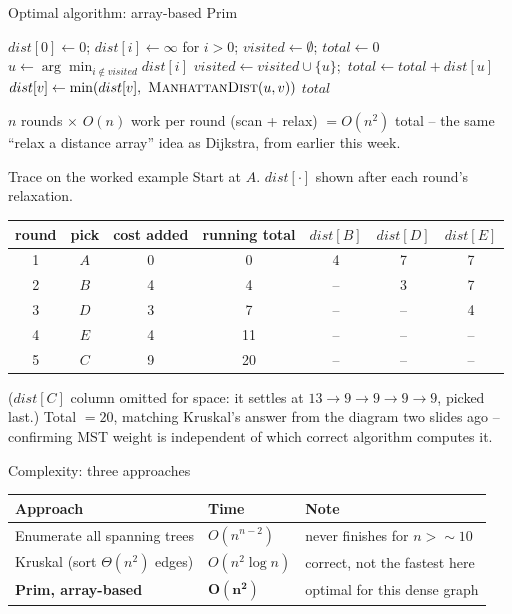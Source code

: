 \documentclass[11pt,aspectratio=169]{beamer}
\begin{document}
\begin{frame}{Optimal algorithm: array-based Prim}
  \footnotesize
  \begin{algorithmic}[1]
      \State $dist[0] \gets 0$; $dist[i] \gets \infty$ for $i>0$; $visited \gets \emptyset$; $total \gets 0$
        \State $u \gets \arg\min_{i \notin visited} dist[i]$ 
        \State $visited \gets visited \cup \{u\}$;\ $total \gets total + dist[u]$
          \State $dist[v] \gets \min(dist[v],\ \textsc{ManhattanDist}(u,v))$
        \EndFor
      \EndFor
      \State \Return $total$
    \EndFunction
  \end{algorithmic}
  $n$ rounds $\times$ $O(n)$ work per round (scan + relax) $= O(n^2)$ total --
  the same ``relax a distance array'' idea as Dijkstra, from earlier this week.
\end{frame}

\begin{frame}{Trace on the worked example}
  \scriptsize
  Start at $A$. $dist[\cdot]$ shown after each round's relaxation.
  \begin{center}
  \begin{tabular}{@{}c c c c c c c@{}}
    \toprule
    round & pick & cost added & running total & $dist[B]$ & $dist[D]$ & $dist[E]$ \\
    \midrule
    1 & $A$ & 0 & 0 & 4 & 7 & 7 \\
    2 & $B$ & 4 & 4 & -- & 3 & 7 \\
    3 & $D$ & 3 & 7 & -- & -- & 4 \\
    4 & $E$ & 4 & 11 & -- & -- & -- \\
    5 & $C$ & 9 & 20 & -- & -- & -- \\
    \bottomrule
  \end{tabular}
  \end{center}
  ($dist[C]$ column omitted for space: it settles at $13\to9\to9\to9\to9$, picked
  last.) Total $=20$, matching Kruskal's answer from the diagram two slides ago
  -- confirming MST weight is independent of which correct algorithm computes it.
\end{frame}

\begin{frame}{Complexity: three approaches}
  \begin{center}
  \begin{tabular}{@{}lll@{}}
    \toprule
    Approach & Time & Note \\
    \midrule
    Enumerate all spanning trees & $O(n^{n-2})$ & never finishes for $n>{\sim}10$ \\
    Kruskal (sort $\Theta(n^2)$ edges) & $O(n^2\log n)$ & correct, not the fastest here \\
    \textbf{Prim, array-based} & $\boldsymbol{O(n^2)}$ & optimal for this dense graph \\
    \bottomrule
  \end{tabular}
  \end{center}
\end{frame}
\end{document}
